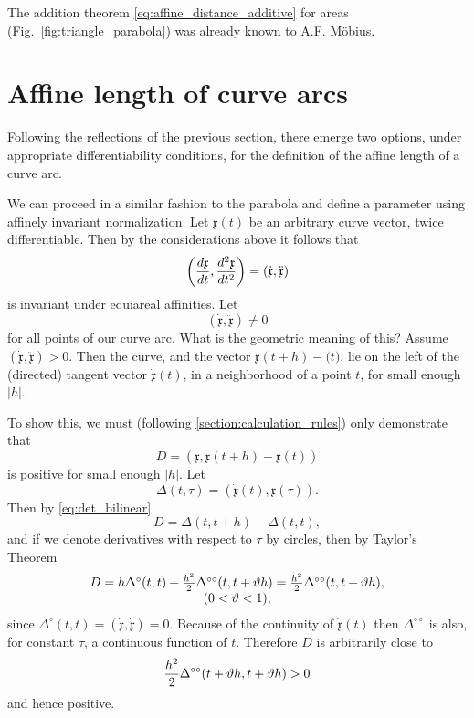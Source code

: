 \documentclass[11pt]{book} \usepackage{amssymb}
\newcommand{\myvec}[1]{\mathfrak{#1}}
\newcommand{\vecx}{\myvec{x}}
\newcommand{\vecderiv}[1]{\dot{\myvec{#1}}}
\newcommand{\vecderivv}[1]{\ddot{\myvec{#1}}}
\begin{document}
The addition theorem \eqref{eq:affine_distance_additive} for areas 
(Fig.~\ref{fig:triangle_parabola}) was already known to A.F. M\"obius.

\section{Affine length of curve arcs}

Following the reflections of the previous section, there emerge two options,
under appropriate differentiability conditions, for the definition of the 
affine length of a curve arc.

We can proceed in a similar fashion to the parabola and define a parameter
using affinely invariant normalization. Let $\vecx(t)$ be an arbitrary
curve vector, twice differentiable. Then by the considerations above it 
follows that
$$\left({d\vecx\over dt},{d^2\vecx\over dt^2}\right)
=(\vecderiv{x},\vecderivv{x})$$
is invariant under equiareal affinities. Let 
\begin{equation}
  \label{eq:no_inflection}
  (\vecderiv{x},\vecderivv{x})\neq 0
\end{equation}
for all points of our curve arc. What is the geometric meaning of this? Assume
$(\vecderiv{x},\vecderivv{x}) > 0$. Then the curve, and the vector
$\vecx(t+h)-\myvec(t)$, lie on the left of the (directed) tangent vector
$\vecderiv{x}(t)$, in a neighborhood of a point $t$, for small enough $|h|$.

To show this, we must (following \ref{section:calculation_rules}) 
only demonstrate that
$$ D=(\vecderiv{x}, \vecx(t+h)-\vecx(t))$$
is positive for small enough $|h|$. Let
$$\Delta(t,\tau)=(\vecderiv{x}(t),\vecx(\tau)).$$
Then by \eqref{eq:det_bilinear}
$$D=\Delta(t,t+h)-\Delta(t,t),$$
and if we denote derivatives with respect to $\tau$ by circles, then by 
Taylor's Theorem
\begin{equation}
  \label{eq:distance_taylor}
  \begin{array}{c}    
    D=h\Delta^{\circ}(t,t)+{h^2\over 2}\Delta^{\circ\circ}(t,t+\vartheta h)
    = {h^2\over 2}\Delta^{\circ\circ}(t,t+\vartheta h),\\
    (0<\vartheta<1),
  \end{array}      
\end{equation}
since $\Delta^\circ(t,t)=(\vecderiv{x},\vecderiv{x})=0$. Because of the 
continuity of $\vecderiv{x}(t)$ then $\Delta^{\circ\circ}$ is also, for constant
$\tau$, a continuous function of $t$. Therefore $D$ is arbitrarily close to
\begin{equation}
  \label{eq:d_approx}
  {h^2\over 2}\Delta^{\circ\circ}(t+\vartheta h, t+ \vartheta h)>0
\end{equation}
and hence positive.
\end{document}
